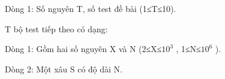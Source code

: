 Dòng 1: Số nguyên T, số test đề bài (1≤T≤10).  

   T bộ test tiếp theo có dạng:  

   Dòng 1: Gồm hai số nguyên X và N (2≤X≤$10^{3}$   , 1≤N≤$10^{6}$   ).  

   Dòng 2: Một xâu S có độ dài N.